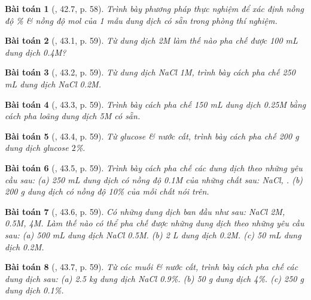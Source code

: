 \documentclass{article}
\newtheorem{baitoan}{Bài toán}
\begin{document}
\begin{baitoan}[\cite{SBT_Hoa_Hoc_8}, 42.7, p. 58]
	Trình bày phương pháp thực nghiệm để xác định nồng độ \% \& nồng độ mol của 1 mẫu dung dịch \emph{} có sẵn trong phòng thí nghiệm.
\end{baitoan}

\begin{baitoan}[\cite{SBT_Hoa_Hoc_8}, 43.1, p. 59]
	Từ dung dịch \emph{ 2M} làm thế nào pha chế được \emph{100 mL} dung dịch \emph{ 0.4M}?
\end{baitoan}

\begin{baitoan}[\cite{SBT_Hoa_Hoc_8}, 43.2, p. 59]
	Từ dung dịch \emph{NaCl 1M}, trình bày cách pha chế \emph{250 mL} dung dịch \emph{NaCl 0.2M}.
\end{baitoan}

\begin{baitoan}[\cite{SBT_Hoa_Hoc_8}, 43.3, p. 59]
	Trình bày cách pha chế \emph{150 mL} dung dịch \emph{ 0.25M} bằng cách pha loãng dung dịch \emph{ 5M} có sẵn.
\end{baitoan}

\begin{baitoan}[\cite{SBT_Hoa_Hoc_8}, 43.4, p. 59]
	Từ glucose \emph{} \& nước cất, trình bày cách pha chế \emph{200 g} dung dịch glucose $2$\%.
\end{baitoan}

\begin{baitoan}[\cite{SBT_Hoa_Hoc_8}, 43.5, p. 59]
	Trình bày cách pha chế các dung dịch theo những yêu cầu sau: (a) \emph{250 mL} dung dịch có nồng độ \emph{0.1M} của những chất sau: \emph{NaCl, }. (b) \emph{200 g} dung dịch có nồng độ \emph{10\%} của mỗi chất nói trên.
\end{baitoan}

\begin{baitoan}[\cite{SBT_Hoa_Hoc_8}, 43.6, p. 59]
	Có những dung dịch ban đầu như sau: \emph{NaCl 2M,  0.5M,  4M}. Làm thế nào có thể pha chế được những dung dịch theo những yêu cầu sau: (a) \emph{500 mL} dung dịch \emph{NaCl 0.5M}. (b) \emph{2 L} dung dịch \emph{ 0.2M}. (c) \emph{50 mL} dung dịch \emph{ 0.2M}.
\end{baitoan}

\begin{baitoan}[\cite{SBT_Hoa_Hoc_8}, 43.7, p. 59]
	Từ các muối \& nước cất, trình bày cách pha chế các dung dịch sau: (a) \emph{2.5 kg} dung dịch \emph{NaCl 0.9\%}. (b) \emph{50 g} dung dịch \emph{ 4\%}. (c) \emph{250 g} dung dịch \emph{ 0.1\%}.
\end{baitoan}
\end{document}

